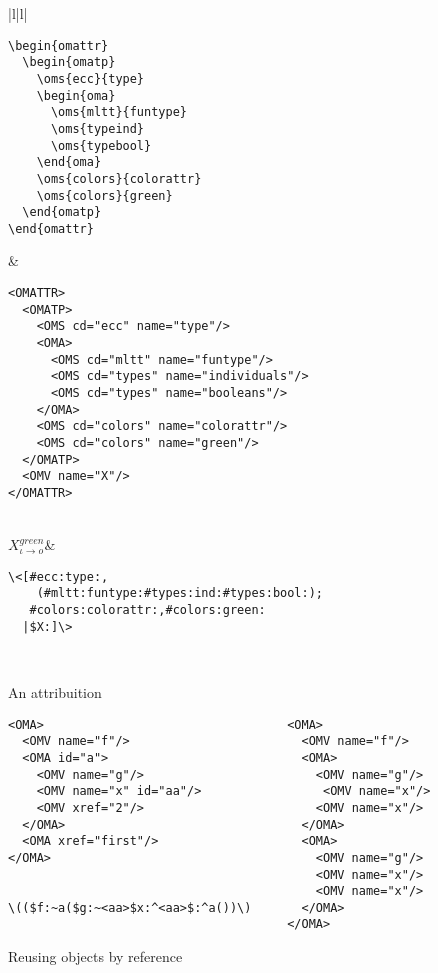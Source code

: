 \begin{figure}[htbp]
  \begin{center}
    \begin{tabular}{|l|l|}\hline
\begin{minipage}{5.5cm}
\begin{verbatim}
\begin{omattr}
  \begin{omatp}
    \oms{ecc}{type}
    \begin{oma}
      \oms{mltt}{funtype}
      \oms{typeind}
      \oms{typebool}
    \end{oma}
    \oms{colors}{colorattr}
    \oms{colors}{green}
  \end{omatp}
\end{omattr}
\end{verbatim}
\end{minipage} &
\begin{minipage}{8cm}\small
\begin{verbatim}
<OMATTR>
  <OMATP>
    <OMS cd="ecc" name="type"/>
    <OMA>
      <OMS cd="mltt" name="funtype"/>
      <OMS cd="types" name="individuals"/>
      <OMS cd="types" name="booleans"/>
    </OMA>  
    <OMS cd="colors" name="colorattr"/>
    <OMS cd="colors" name="green"/>
  </OMATP>
  <OMV name="X"/>
</OMATTR>
\end{verbatim}
\end{minipage}\\\hline
$X_{\iota\rightarrow o}^{green}$&
\begin{minipage}{8cm}
\begin{verbatim}
\<[#ecc:type:,
    (#mltt:funtype:#types:ind:#types:bool:);
   #colors:colorattr:,#colors:green:
  |$X:]\>
\end{verbatim}
\end{minipage}\\\hline
\end{tabular}
\caption{An {\openmath} attribuition}
    \label{fig:omattr}
  \end{center}
\end{figure}

\begin{figure}[htbp]
  \begin{center}
{\footnotesize\begin{verbatim}
<OMA>                                  <OMA>
  <OMV name="f"/>                        <OMV name="f"/>
  <OMA id="a">                           <OMA>
    <OMV name="g"/>                        <OMV name="g"/>
    <OMV name="x" id="aa"/>                 <OMV name="x"/>
    <OMV xref="2"/>                        <OMV name="x"/>
  </OMA>                                 </OMA>
  <OMA xref="first"/>                    <OMA>
</OMA>                                     <OMV name="g"/>
                                           <OMV name="x"/>
                                           <OMV name="x"/>
\(($f:~a($g:~<aa>$x:^<aa>$:^a())\)       </OMA>
                                       </OMA>
\end{verbatim}
}
    \caption{Reusing {\openmath} objects by reference}
    \label{fig:reference}
  \end{center}
\end{figure}
